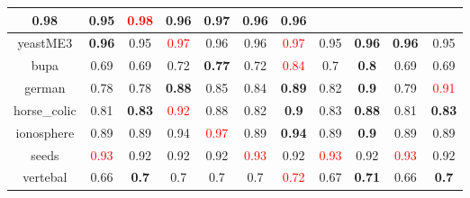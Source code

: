 \documentclass{article}%
\begin{document}
\begin{tabular}{c|cccccccccc}
{0.98
}&0.95&\textcolor{red}{ 
0.98
}&0.96&\textbf{0.97}&0.96&0.96\\%
\hline%
yeastME3&\textbf{0.96}&0.95&\textcolor{red}{ 
0.97
}&0.96&0.96&\textcolor{red}{ 
0.97
}&0.95&\textbf{0.96}&\textbf{0.96}&0.95\\%
\hline%
bupa&0.69&0.69&0.72&\textbf{0.77}&0.72&\textcolor{red}{ 
0.84
}&0.7&\textbf{0.8}&0.69&0.69\\%
\hline%
german&0.78&0.78&\textbf{0.88}&0.85&0.84&\textbf{0.89}&0.82&\textbf{0.9}&0.79&\textcolor{red}{ 
0.91
}\\%
\hline%
horse\_colic&0.81&\textbf{0.83}&\textcolor{red}{ 
0.92
}&0.88&0.82&\textbf{0.9}&0.83&\textbf{0.88}&0.81&\textbf{0.83}\\%
\hline%
ionosphere&0.89&0.89&0.94&\textcolor{red}{ 
0.97
}&0.89&\textbf{0.94}&0.89&\textbf{0.9}&0.89&0.89\\%
\hline%
seeds&\textcolor{red}{ 
0.93
}&0.92&0.92&0.92&\textcolor{red}{ 
0.93
}&0.92&\textcolor{red}{ 
0.93
}&0.92&\textcolor{red}{ 
0.93
}&0.92\\%
\hline%
vertebal&0.66&\textbf{0.7}&0.7&0.7&0.7&\textcolor{red}{ 
0.72
}&0.67&\textbf{0.71}&0.66&\textbf{0.7}\\%
\hline%
\end{tabular}

%
\end{document}

